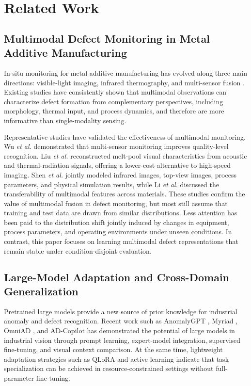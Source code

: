 \documentclass[journal]{IEEEtran}
\begin{document}
\section{Related Work}
\subsection{Multimodal Defect Monitoring in Metal Additive Manufacturing}

In-situ monitoring for metal additive manufacturing has evolved along three main directions: visible-light imaging, infrared thermography, and multi-sensor fusion \cite{ref_defect_formation_slm,ref_in_situ_monitoring_review,ref_lpbf_sensing_review,ref_intelligent_defect_pbf}. Existing studies have consistently shown that multimodal observations can characterize defect formation from complementary perspectives, including morphology, thermal input, and process dynamics, and therefore are more informative than single-modality sensing.

Representative studies have validated the effectiveness of multimodal monitoring. Wu \emph{et al.} \cite{ref_wu2024_multisensor} demonstrated that multi-sensor monitoring improves quality-level recognition. Liu \emph{et al.} \cite{ref_liu2024_acoustic} reconstructed melt-pool visual characteristics from acoustic and thermal-radiation signals, offering a lower-cost alternative to high-speed imaging. Shen \emph{et al.} \cite{ref_shen2024_multisource} jointly modeled infrared images, top-view images, process parameters, and physical simulation results, while Li \emph{et al.} \cite{ref_li2024_transfer} discussed the transferability of multimodal features across materials. These studies confirm the value of multimodal fusion in defect monitoring, but most still assume that training and test data are drawn from similar distributions. Less attention has been paid to the distribution shift jointly induced by changes in equipment, process parameters, and operating environments under unseen conditions. In contrast, this paper focuses on learning multimodal defect representations that remain stable under condition-disjoint evaluation.

\subsection{Large-Model Adaptation and Cross-Domain Generalization}

Pretrained large models provide a new source of prior knowledge for industrial anomaly and defect recognition. Recent work such as AnomalyGPT \cite{ref_anomalygpt}, Myriad \cite{ref_myriad}, OmniAD \cite{ref_omniad}, and AD-Copilot \cite{ref_ad_copilot} has demonstrated the potential of large models in industrial vision through prompt learning, expert-model integration, supervised fine-tuning, and visual context comparison. At the same time, lightweight adaptation strategies such as QLoRA and active learning \cite{ref_qlora_excavator,ref_vlm_active_learning} indicate that task specialization can be achieved in resource-constrained settings without full-parameter fine-tuning.
\end{document}
